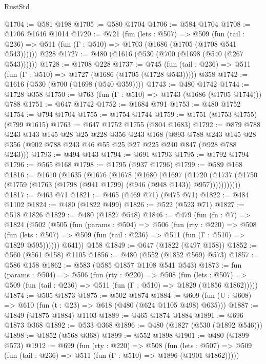 \begin{lexlean}{RustStd}
\begin{coremodule}
@1704 := @581 @198
@1705 := @580 @1704
@1706 := @584 @1704
@1708 := @1706 @1646 @1014
@1720 := @721
    (fun (lets : @507) =>
    @509 (fun (tail : @236) => @511 (fun (Γ : @510) => @1703 (@1686 (@1705 (@1708 @541 @543))))))
    @228
@1727 := @480 (@1616 (@530 (@700 (@1698 (@540 (@267 @543))))))
@1728 := @1708 @228
@1737 := @745
    (fun (tail : @236) => @511 (fun (Γ : @510) => @1727 (@1686 (@1705 (@1728 @543)))))
    @358
@1742 := @1616 (@530 (@700 (@1698 (@540 @359))))
@1743 := @480 @1742
@1744 := @1728 @358
@1750 := @763 (fun (Γ : @510) => @1743 (@1686 (@1705 @1744))) @788
@1751 := @647 @1742
@1752 := @1684 @791
@1753 := @480 @1752
@1754 := @794 @1704
@1755 := @1754 @1744
@1759 := @1751 (@1753 @1755) (@799 @1615)
@1763 := @647 @1752 @1755 (@804 @1683)
@1792 := @879
    @788
    @243
    @143
    @145
    @28
    @25
    @228
    @356
    @243
    @168
    (@893 @788 @243 @145 @28 @356 (@902 @788 @243 @46 @55 @25 @27 @225 @240 @847 (@928 @788 @243)))
@1793 := @494 @143
@1794 := @691 @1793
@1795 := @1792 @1794
@1796 := @565 @168
@1798 := @1795 (@937 @1796)
@1799 := @589 @168
@1816 := @1610
    (@1635
      (@1676
        (@1678
          (@1680
            (@1697
              (@1720
                (@1737 (@1750 (@1759 (@1763 (@1798 (@941 @1799) (@946 (@948 @143)) @957)))))))))))
@1817 := @463 @71
@1821 := @465 (@469 @71) (@475 @71)
@1822 := @484 @1102
@1824 := @480 (@1822 @499)
@1826 := @522 (@523 @71)
@1827 := @518 @1826
@1829 := @480 (@1827 @548)
@1846 := @479
    (fun (fn : @7) =>
    @1824
      (@502
        (@505
          (fun (params : @504) =>
          @506
            (fun (rty : @220) =>
            @508
              (fun (lets : @507) =>
              @509 (fun (tail : @236) => @511 (fun (Γ : @510) => @1829 @595))))))
        @641))
    @158
@1849 := @647 (@1822 (@497 @158))
@1852 := @560 (@561 @158) @1105
@1856 := @480 (@552 (@1852 @569) @573)
@1857 := @586 @158
@1862 := @583 (@585 @1857 @1108 @541 @543)
@1873 := fun (params : @504) =>
  @506
    (fun (rty : @220) =>
    @508
      (fun (lets : @507) =>
      @509 (fun (tail : @236) => @511 (fun (Γ : @510) => @1829 (@1856 @1862)))))
@1874 := @505 @1873
@1875 := @502 @1874
@1884 := @609 (fun (U : @608) => @610 (fun (t : @23) => @618 (@480 (@624 @1105 @498) @635)))
@1887 := @1849 (@1875 @1884) @1103
@1889 := @465 @1874 @1884
@1891 := @696 @1873 @368
@1892 := @533 @368
@1896 := @480 (@1827 (@530 (@1892 @546)))
@1898 := @1852 (@568 @368)
@1899 := @552 @1898
@1901 := @480 (@1899 @573)
@1912 := @699
    (fun (rty : @220) =>
    @508
      (fun (lets : @507) =>
      @509 (fun (tail : @236) => @511 (fun (Γ : @510) => @1896 (@1901 @1862)))))

\end{coremodule}
\end{lexlean}
